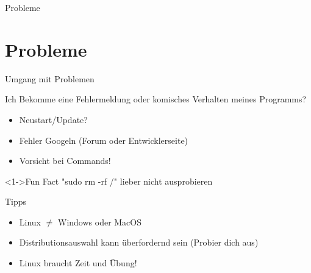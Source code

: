 
\begin{frame}{Probleme}
    \section{Probleme}\label{sec:probleme}

\end{frame}

\begin{frame}{Umgang mit Problemen}

    Ich Bekomme eine Fehlermeldung oder komisches Verhalten meines Programms?

    \begin{itemize}
        \item Neustart/Update?
        \item Fehler Googeln (Forum oder Entwicklerseite)
        \item Vorsicht bei Commands!
    \end{itemize}

    \vspace{0.5cm}
    \begin{exampleblock}<1->{Fun Fact}
        "sudo rm -rf /" lieber nicht ausprobieren
    \end{exampleblock}

\end{frame}

\begin{frame}{Tipps}

    \begin{itemize}
        \item {Linux $\neq$ Windows oder MacOS}
        \item Distributionsauswahl kann überfordernd sein (Probier dich aus)
        \item Linux braucht Zeit und Übung!
    \end{itemize}

\end{frame}
